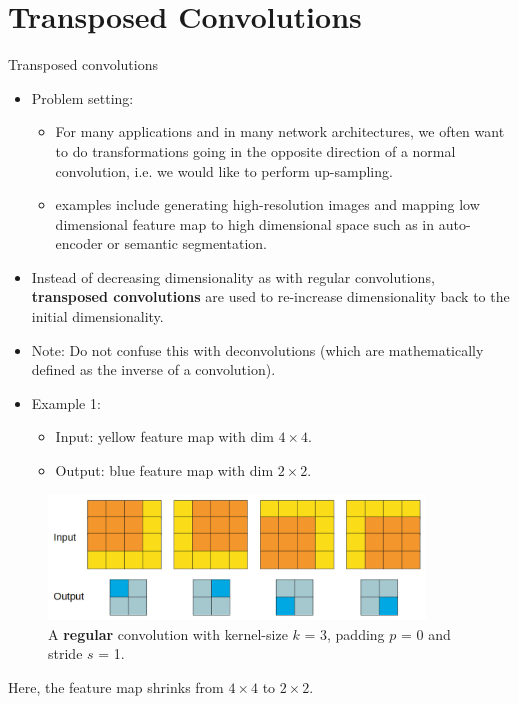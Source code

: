 
\section{Transposed Convolutions}


\begin{vbframe}{Transposed convolutions}
    \begin{itemize}
        \item Problem setting: 
        \begin{itemize}
            \item For many applications and in many network architectures, we often want to do transformations going in the opposite direction of a normal convolution, i.e. we would like to perform up-sampling.
            \item examples include generating high-resolution images and mapping low dimensional feature map to high dimensional space such as in auto-encoder or semantic segmentation.
        \end{itemize}
        \item Instead of decreasing dimensionality as with regular convolutions, \textbf{transposed convolutions} are used to re-increase dimensionality back to the initial dimensionality.
        \item Note: Do not confuse this with deconvolutions (which are mathematically defined as the inverse of a convolution).
    \end{itemize}
    
\framebreak
\begin{itemize}
\item Example 1:
  \begin{itemize}
  \item Input: yellow feature map with dim $4\times 4$.
  \item Output: blue feature map with dim $2\times 2$.
  \end{itemize}
\end{itemize}
\begin{figure}
\centering
\includegraphics[width=10cm]{figure/transposedconv-1.png}
      \caption{ A \textbf{regular} convolution with kernel-size $k$ = 3, padding $p$ = 0 and stride $s$ = 1.}
\end{figure}
    Here, the feature map shrinks from $4\times 4$ to $2\times 2$.


\end{vbframe}
